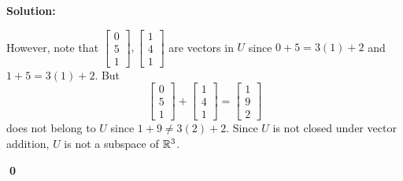 \documentclass{article}
\newenvironment{solution}
{
	\ignorespaces
	\textbf{Solution:}
}
{
	\ignorespacesafterend
	\begin{flushright}
	{\bfseries \qed}
	\end{flushright}
}
\begin{document}
\begin{solution}
However, note that
\(
	\begin{bmatrix} 0 \\ 5 \\ 1 \end{bmatrix},
	\begin{bmatrix} 1 \\ 4 \\ 1 \end{bmatrix}
\)
are vectors in \(U\) since \(0+5=3(1)+2\) and \(1+5=3(1)+2\).
But
\[
	\begin{bmatrix} 0 \\ 5 \\ 1 \end{bmatrix}
		+
	\begin{bmatrix} 1 \\ 4 \\ 1 \end{bmatrix}
		=
	\begin{bmatrix} 1 \\ 9 \\ 2 \end{bmatrix}
\]
does not belong to \(U\) since \(1+9\not=3(2)+2\).
Since \(U\) is not closed under vector addition, \(U\) is not a subspace
of \(\mathbb{R}^3\).
\end{solution}
\end{document}
